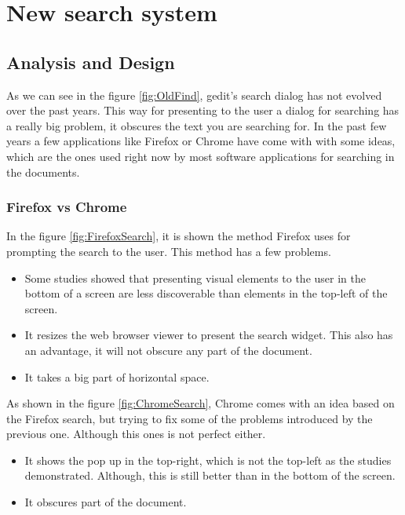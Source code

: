 
\chapter{New search system}

\section{Analysis and Design}


As we can see in the figure \ref{fig:OldFind}, gedit's search dialog has not evolved over the past years. This way for presenting to the user a dialog for searching has a really big problem, it obscures the text you are searching for. In the past few years a few applications like Firefox or Chrome have come with with some ideas, which are the ones used right now by most software applications for searching in the documents.

\newpage
\subsection{Firefox vs Chrome}

In the figure \ref{fig:FirefoxSearch}, it is shown the method Firefox uses for prompting the search to the user. This method has a few problems.
\begin{itemize}
  \item Some studies showed that presenting visual elements to the user in the bottom of a screen are less discoverable than elements in the top-left of the screen.
  \item It resizes the web browser viewer to present the search widget. This also has an advantage, it will not obscure any part of the document.
  \item It takes a big part of horizontal space.
\end{itemize}


As shown in the figure \ref{fig:ChromeSearch}, Chrome comes with an idea based on the Firefox search, but trying to fix some of the problems introduced by the previous one. Although this ones is not perfect either.
\begin{itemize}
  \item It shows the pop up in the top-right, which is not the top-left as the studies demonstrated. Although, this is still better than in the bottom of the screen.
  \item It obscures part of the document.
\end{itemize}

